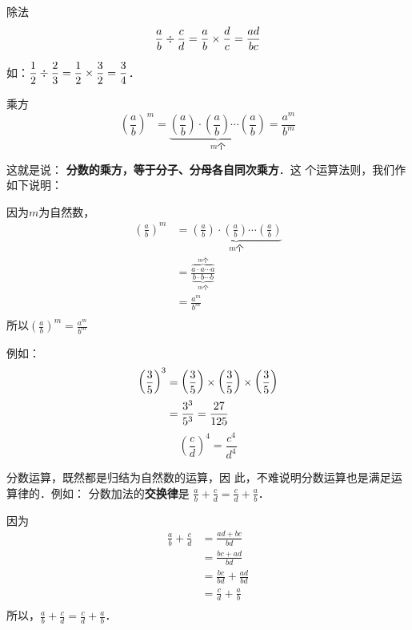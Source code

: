\begin{blk}{除法}
	\[\dfrac{a}{b}\div \dfrac{c}{d}=\dfrac{a}{b}\times\dfrac{d}{c}=\dfrac{ad}{bc}\]
\end{blk}

如：$\dfrac{1}{2}\div\dfrac{2}{3}=\dfrac{1}{2}\times \dfrac{3}{2}=\dfrac{3}{4}$．

\begin{blk}{乘方}
	\[\left(\frac{a}{b}\right)^m=\underbrace{\left(\frac{a}{b}\right)\cdot \left(\frac{a}{b}\right)\cdots \left(\frac{a}{b}\right)}_{\text{$m$个}}=\frac{a^m}{b^m}\]
\end{blk}

这就是说：
\textbf{分数的乘方，等于分子、分母各自同次乘方}．这
个运算法则，我们作如下说明：

\begin{note}
	因为$m$为自然数，
	\begin{align*}
	\left(\frac{a}{b}\right)^m&=\underbrace{\left(\frac{a}{b}\right)\cdot \left(\frac{a}{b}\right)\cdots \left(\frac{a}{b}\right)}_{\text{$m$个}}
	\tag{乘方的意义}\\
	&=\frac{\overbrace{a\cdot a\cdots a}^{\text{$m$个}}}{\underbrace{b\cdot b\cdots b}_{\text{$m$个}}} \tag{分数乘法法则}\\
	&= \frac{a^m}{b^m}\tag{乘方的意义}\\
	\end{align*}
	所以$\left(\frac{a}{b}\right)^m=\frac{a^m}{b^m}$
\end{note}

例如：
\[ \begin{split}
\left(\dfrac{3}{5}\right)^3&=\left(\dfrac{3}{5}\right)\times \left(\dfrac{3}{5}\right)\times \left(\dfrac{3}{5}\right)\\
&=\dfrac{3^3}{5^3}=\dfrac{27}{125}
\end{split} \]
\[ \left(\frac{c}{d}\right)^4=\frac{c^4}{d^4} \]

分数运算，既然都是归结为自然数的运算，因
此，不难说明分数运算也是满足运算律的．例如：
分数加法的\textbf{交换律}是
$\frac{a}{b}+\frac{c}{d}=\frac{c}{d}+\frac{a}{b}$．

\begin{note}
	因为
	\begin{align*}
	\frac{a}{b}+\frac{c}{d}&=\frac{ad+bc}{bd} \tag{分数加法法则}\\
	&=\frac{bc+ad}{bd}\tag{自然数加法交换律}\\
	&=\frac{bc}{bd}+\frac{ad}{bd}\\
	&=\frac{c}{d}+\frac{a}{b}\tag{分数的基本性质}\\
	\end{align*}
	所以，$\frac{a}{b}+\frac{c}{d}=\frac{c}{d}+\frac{a}{b}$．
\end{note}

